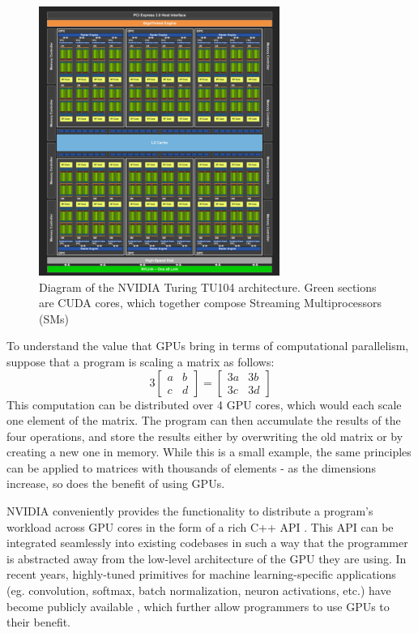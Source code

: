 \documentclass[12pt,letterpaper]{article}
\begin{document}
\begin{figure}[ht]
\centering
\includegraphics[width=0.7\textwidth]{Turing_TU104_chip_diagram.png}
\captionsetup{width=0.7\linewidth}
\caption{ Diagram of the NVIDIA Turing TU104 architecture. Green sections are CUDA cores, which together compose Streaming Multiprocessors (SMs) \cite{turing_architecture}}
\label{fig:turing}
\end{figure}

To understand the value that GPUs bring in terms of computational parallelism, suppose that a program is scaling a matrix as follows:
\[
3
\begin{bmatrix}
    a  &  b      \\
    c  &  d      
\end{bmatrix} 
=
\begin{bmatrix}
    3a  &  3b      \\
    3c  &  3d      
\end{bmatrix} 
\]
This computation can be distributed over 4 GPU cores, which would each scale one element of the matrix. The program can then accumulate the results of the four operations, and store the results either by overwriting the old matrix or by creating a new one in memory. While this is a small example, the same principles can be applied to matrices with thousands of elements - as the dimensions increase, so does the benefit of using GPUs. 
\par

NVIDIA conveniently provides the functionality to distribute a program's workload across GPU cores in the form of a rich C++ API \cite{cuda_guide}. This API can be integrated seamlessly into existing codebases in such a way that the programmer is abstracted away from the low-level architecture of the GPU they are using. In recent years, highly-tuned primitives for machine learning-specific applications (eg. convolution, softmax, batch normalization, neuron activations, etc.) have become publicly available \cite{cudnn}, which further allow programmers to use GPUs to their benefit.
\par 
\end{document}
